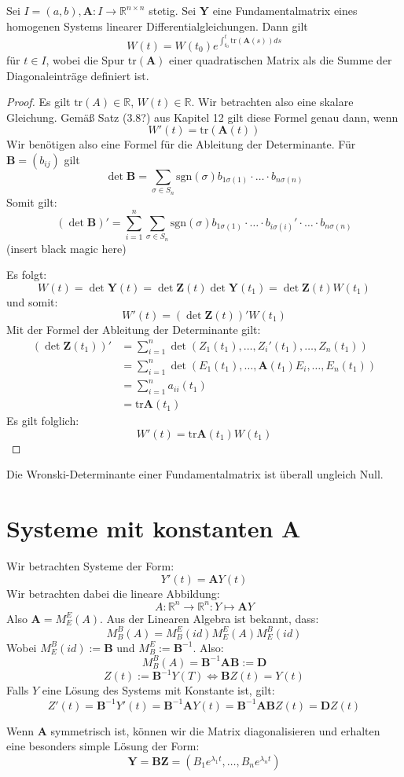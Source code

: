 \documentclass{report}
\newcommand*{\newpar}{\par\vspace{\baselineskip}\noindent}
\newcommand{\bR}{\mathbb{R}}
\newcommand{\tbA}{\mathbf{A}}
\newcommand{\tbB}{\mathbf{B}}
\newcommand{\tbD}{\mathbf{D}}
\newcommand{\tbY}{\mathbf{Y}}
\newcommand{\tbZ}{\mathbf{Z}}
\renewcommand{\tr}{\text{tr}}
\begin{document}
\begin{theorem}
	Sei $I = (a,b), \tbA : I \to \bR^{n \times n}$ stetig. Sei $\tbY$ eine Fundamentalmatrix eines homogenen Systems linearer Differentialgleichungen. Dann gilt
	\[W(t) = W(t_0) e^{\int_{t_0}^t \tr(\tbA(s)) ds}\]
	für $t \in I$, wobei die Spur $\tr(\tbA)$ einer quadratischen Matrix als die Summe der Diagonaleinträge definiert ist.
\end{theorem}
\begin{proof}
	Es gilt $\tr(A) \in \bR$, $W(t) \in \bR$. Wir betrachten also eine skalare Gleichung. Gemäß Satz (3.8?) aus Kapitel 12 gilt diese Formel genau dann, wenn
	\[W'(t) = \tr(\tbA(t))\]
	Wir benötigen also eine Formel für die Ableitung der Determinante. Für $\tbB = (b_{ij})$ gilt
	\[\det \tbB = \sum_{\sigma \in S_n} \text{sgn}(\sigma) b_{1\sigma(1)} \cdot \hdots \cdot b_{n\sigma(n)}\]
	Somit gilt:
	\[(\det \tbB)' = \sum_{i=1}^n \sum_{\sigma \in S_n} \text{sgn}(\sigma) b_{1\sigma(1)} \cdot \hdots \cdot b_{i \sigma(i)}' \cdot \hdots \cdot b_{n\sigma(n)}\]
	(insert black magic here)
	\newpar
	Es folgt:
	\[W(t) = \det \tbY(t) = \det \tbZ(t) \det \tbY(t_1) = \det \tbZ(t) W(t_1)\]
	und somit:
	\[W'(t) = (\det \tbZ(t))' W(t_1)\]
	Mit der Formel der Ableitung der Determinante gilt:
	\begin{align*}
		(\det \tbZ(t_1))' &= \sum_{i = 1}^n \det (Z_1(t_1), \hdots, Z_i'(t_1), \hdots, Z_n(t_1))\\
						  &= \sum_{i = 1}^n \det (E_1(t_1), \hdots, \tbA(t_1)E_i, \hdots, E_n(t_1))\\
						  &= \sum_{i = 1}^n a_{ii}(t_1)\\
						  &= \tr \tbA(t_1)
	\end{align*}
	Es gilt folglich:
	\[W'(t) = \tr \tbA(t_1)W(t_1)\]
\end{proof}
\begin{corollary}
	Die Wronski-Determinante einer Fundamentalmatrix ist überall ungleich Null.
\end{corollary}
\section{Systeme mit konstanten A}
Wir betrachten Systeme der Form:
\[Y'(t) = \tbA Y(t)\]
Wir betrachten dabei die lineare Abbildung:
\[A : \bR^n \to \bR^n : Y \mapsto \tbA Y\]
Also $\tbA = M_{E}^{E}(A)$. Aus der Linearen Algebra ist bekannt, dass:
\[M^{B}_B(A) = M_B^E(id) M_E^E(A) M_E^B(id)\]
Wobei $M_E^B(id) := \tbB$ und $M_B^E := \tbB^{-1}$. Also:
\[M_B^B(A) = \tbB^{-1} \tbA \tbB := \tbD\]
\[Z(t) := \tbB^{-1}Y(T) \Leftrightarrow \tbB Z(t) = Y(t)\]
Falls $Y$ eine Lösung des Systems mit Konstante ist, gilt:
\[Z'(t) = \tbB^{-1}Y'(t) = \tbB^{-1}\tbA Y(t) = \tbB^{-1}\tbA\tbB Z(t) = \tbD Z(t)\]
\begin{theorem}
	Wenn $\tbA$ symmetrisch ist, können wir die Matrix diagonalisieren und erhalten eine besonders simple Lösung der Form:
	\[\tbY = \tbB \tbZ = (B_1 e^{\lambda_1 t}, \hdots, B_n e^{\lambda_n t})\]
\end{theorem}
%
%
%
%
%
%
%
%
%
%
\end{document}
